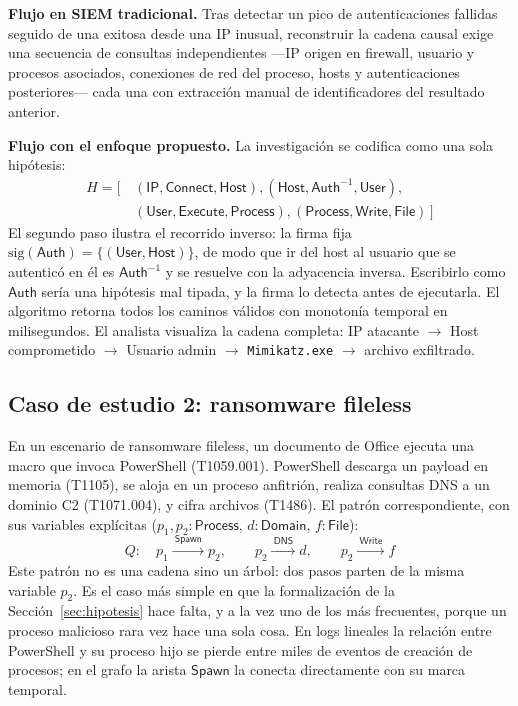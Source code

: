 \documentclass[11pt,a4paper]{article}
\newcommand{\code}[1]{\texttt{#1}}
\begin{document}
\textbf{Flujo en SIEM tradicional.} Tras detectar un pico de autenticaciones
fallidas seguido de una exitosa desde una IP inusual, reconstruir la cadena
causal exige una secuencia de consultas independientes ---IP origen en
firewall, usuario y procesos asociados, conexiones de red del proceso, hosts y
autenticaciones posteriores--- cada una con extracción manual de identificadores
del resultado anterior.

\textbf{Flujo con el enfoque propuesto.} La investigación se codifica como una
sola hipótesis:
\begin{align*}
H = [\,&(\mathsf{IP}, \mathsf{Connect}, \mathsf{Host}),
(\mathsf{Host}, \mathsf{Auth}^{-1}, \mathsf{User}),\\
&(\mathsf{User}, \mathsf{Execute}, \mathsf{Process}),
(\mathsf{Process}, \mathsf{Write}, \mathsf{File})\,]
\end{align*}
El segundo paso ilustra el recorrido inverso: la firma fija
$\mathrm{sig}(\mathsf{Auth}) = \{(\mathsf{User}, \mathsf{Host})\}$, de modo que
ir del host al usuario que se autenticó en él es $\mathsf{Auth}^{-1}$ y se
resuelve con la adyacencia inversa. Escribirlo como $\mathsf{Auth}$ sería una
hipótesis mal tipada, y la firma lo detecta antes de ejecutarla.
El algoritmo retorna todos los caminos válidos con monotonía temporal en
milisegundos. El analista visualiza la cadena completa: IP atacante $\to$ Host
comprometido $\to$ Usuario admin $\to$ \code{Mimikatz.exe} $\to$ archivo
exfiltrado.

\subsection{Caso de estudio 2: ransomware fileless}
En un escenario de ransomware fileless, un documento de Office ejecuta una
macro que invoca PowerShell (T1059.001). PowerShell descarga un payload en
memoria (T1105), se aloja en un proceso anfitrión, realiza consultas DNS a un
dominio C2 (T1071.004), y cifra archivos (T1486). El patrón correspondiente,
con sus variables explícitas ($p_1, p_2 : \mathsf{Process}$,
$d : \mathsf{Domain}$, $f : \mathsf{File}$):
\[
Q:\quad p_1 \xrightarrow{\ \mathsf{Spawn}\ } p_2, \qquad
p_2 \xrightarrow{\ \mathsf{DNS}\ } d, \qquad
p_2 \xrightarrow{\ \mathsf{Write}\ } f
\]
Este patrón no es una cadena sino un árbol: dos pasos parten de la misma
variable $p_2$. Es el caso más simple en que la formalización de la
Sección~\ref{sec:hipotesis} hace falta, y a la vez uno de los más frecuentes,
porque un proceso malicioso rara vez hace una sola cosa. En logs lineales la
relación entre PowerShell y su proceso hijo se pierde entre miles de eventos de
creación de procesos; en el grafo la arista $\mathsf{Spawn}$ la conecta
directamente con su marca temporal.
\end{document}
